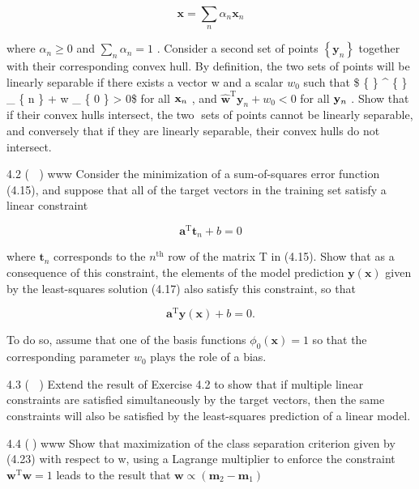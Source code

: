 \documentclass[
  10
]{article}
\begin{document}
\[
\mathbf {x} = \sum_ {n} \alpha_ {n} \mathbf {x} _ {n}\tag{4.156}
\]

where \(\alpha _ { n } \geqslant 0\) and
\(\textstyle \sum _ { n } \alpha _ { n } = 1\) . Consider a second set
of points \(\left\{ \mathbf { y } _ { n } \right\}\) together with their
corresponding convex hull. By definition, the two sets of points will be
linearly separable if there exists a vector w and a scalar \(w _ { 0 }\)
such that \$ \{  \} \^{} \{  \}
 \_ \{ n \} + w \_ \{ 0 \} \textgreater{} 0\$ for all
\({ \bf x } _ { n }\) , and
\(\widehat { \mathbf { w } } ^ { \mathrm { T } } \mathbf { y } _ { n } + w _ { 0 } < 0\)
for all \({ \bf y } _ { n }\) . Show that if their convex hulls
intersect, the two sets of points cannot be linearly separable, and
conversely that if they are linearly separable, their convex hulls do
not intersect.

4.2 ( ) www Consider the minimization of a sum-of-squares error function
(4.15), and suppose that all of the target vectors in the training set
satisfy a linear constraint

\[
\mathbf {a} ^ {\mathrm{T}} \mathbf {t} _ {n} + b = 0\tag{4.157}
\]

where \(\mathbf { t } _ { n }\) corresponds to the
\(n ^ { \mathrm { t h } }\) row of the matrix T in (4.15). Show that as
a consequence of this constraint, the elements of the model prediction
\(\mathbf { y } ( \mathbf { x } )\) given by the least-squares solution
(4.17) also satisfy this constraint, so that

\[
\mathbf {a} ^ {\mathrm{T}} \mathbf {y} (\mathbf {x}) + b = 0.\tag{4.158}
\]

To do so, assume that one of the basis functions
\(\phi _ { 0 } ( \mathbf { x } ) = 1\) so that the corresponding
parameter \(w _ { 0 }\) plays the role of a bias.

4.3 ( ) Extend the result of Exercise 4.2 to show that if multiple
linear constraints are satisfied simultaneously by the target vectors,
then the same constraints will also be satisfied by the least-squares
prediction of a linear model.

4.4 () www Show that maximization of the class separation criterion
given by (4.23) with respect to w, using a Lagrange multiplier to
enforce the constraint
\(\mathbf { w } ^ { \mathrm { T } } \mathbf { w } = 1\) leads to the
result that
\(\mathbf { w } \propto \left( \mathbf { m } _ { 2 } - \mathbf { m } _ { 1 } \right)\)
\end{document}
